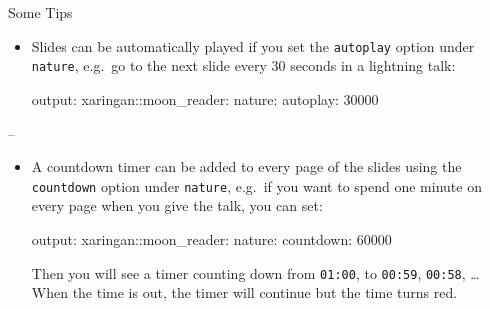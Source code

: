\documentclass[ignorenonframetext,]{beamer}
\newenvironment{Shaded}{\begin{snugshade}}{\end{snugshade}}
\newcommand{\AttributeTok}[1]{\textcolor[rgb]{0.77,0.63,0.00}{#1}}
\newcommand{\FunctionTok}[1]{\textcolor[rgb]{0.00,0.00,0.00}{#1}}
\begin{document}
\begin{frame}[fragile]{Some Tips}
\protect\hypertarget{some-tips-1}{}

\begin{itemize}
\item
  Slides can be automatically played if you set the \texttt{autoplay}
  option under \texttt{nature}, e.g.~go to the next slide every 30
  seconds in a lightning talk:

\begin{Shaded}
\begin{Highlighting}[]
\FunctionTok{output:}
  \FunctionTok{xaringan:}\AttributeTok{:moon_reader:}
    \FunctionTok{nature:}
      \FunctionTok{autoplay:}\AttributeTok{ 30000}
\end{Highlighting}
\end{Shaded}
\end{itemize}

--

\begin{itemize}
\item
  A countdown timer can be added to every page of the slides using the
  \texttt{countdown} option under \texttt{nature}, e.g.~if you want to
  spend one minute on every page when you give the talk, you can set:

\begin{Shaded}
\begin{Highlighting}[]
\FunctionTok{output:}
  \FunctionTok{xaringan:}\AttributeTok{:moon_reader:}
    \FunctionTok{nature:}
      \FunctionTok{countdown:}\AttributeTok{ 60000}
\end{Highlighting}
\end{Shaded}

  Then you will see a timer counting down from \texttt{01:00}, to
  \texttt{00:59}, \texttt{00:58}, \ldots{} When the time is out, the
  timer will continue but the time turns red.
\end{itemize}

\end{frame}
\end{document}
